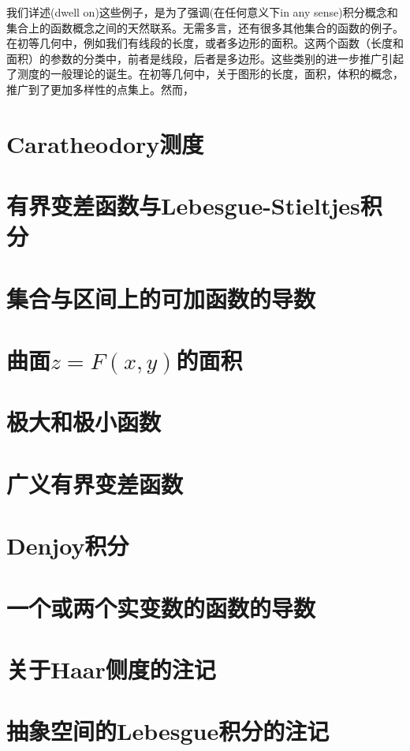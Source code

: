 \documentclass[12pt,a4paper]{book}
\begin{document}
我们详述(dwell on)这些例子，是为了强调(在任何意义下in any sense)积分概念和集合上的函数概念之间的天然联系。无需多言，还有很多其他集合的函数的例子。在初等几何中，例如我们有线段的长度，或者多边形的面积。这两个函数（长度和面积）的参数的分类中，前者是线段，后者是多边形。这些类别的进一步推广引起了测度的一般理论的诞生。在初等几何中，关于图形的长度，面积，体积的概念，推广到了更加多样性的点集上。然而，

\chapter{Caratheodory测度}

\chapter{有界变差函数与Lebesgue-Stieltjes积分}

\chapter{集合与区间上的可加函数的导数}

\chapter{曲面$z = F(x, y)$的面积}

\chapter{极大和极小函数}

\chapter{广义有界变差函数}

\chapter{Denjoy积分}

\chapter{一个或两个实变数的函数的导数}

\chapter{关于Haar侧度的注记}

\chapter{抽象空间的Lebesgue积分的注记}

\printindex[name]
\end{document}
